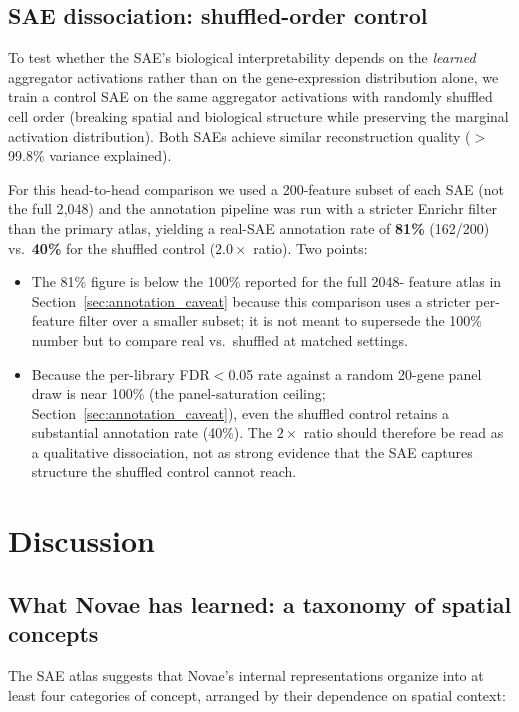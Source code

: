 \documentclass[11pt]{article}
\begin{document}
\subsection{SAE dissociation: shuffled-order control}
\label{sec:dissociation}

To test whether the SAE's biological interpretability depends on the
\emph{learned} aggregator activations rather than on the
gene-expression distribution alone, we train a control SAE on the
same aggregator activations with randomly shuffled cell order
(breaking spatial and biological structure while preserving the
marginal activation distribution). Both SAEs achieve similar
reconstruction quality ($>$99.8\% variance explained).

For this head-to-head comparison we used a 200-feature subset of each
SAE (not the full 2{,}048) and the annotation pipeline was run with a
stricter Enrichr filter than the primary atlas, yielding a real-SAE
annotation rate of \textbf{81\%} (162/200) vs.\ \textbf{40\%} for the
shuffled control ($2.0\times$ ratio). Two points:
\begin{itemize}
\item The 81\% figure is below the 100\% reported for the full 2048-
      feature atlas in Section~\ref{sec:annotation_caveat} because
      this comparison uses a stricter per-feature filter over a
      smaller subset; it is not meant to supersede the 100\% number
      but to compare real vs.\ shuffled at matched settings.
\item Because the per-library FDR$<$0.05 rate against a random
      20-gene panel draw is near 100\% (the panel-saturation ceiling;
      Section~\ref{sec:annotation_caveat}), even the shuffled control
      retains a substantial annotation rate (40\%). The $2\times$
      ratio should therefore be read as a qualitative dissociation,
      not as strong evidence that the SAE captures structure the
      shuffled control cannot reach.
\end{itemize}

\section{Discussion}

\subsection{What Novae has learned: a taxonomy of spatial concepts}
\label{sec:taxonomy}

The SAE atlas suggests that Novae's internal representations
organize into at least four categories of concept, arranged by
their dependence on spatial context:
\end{document}
